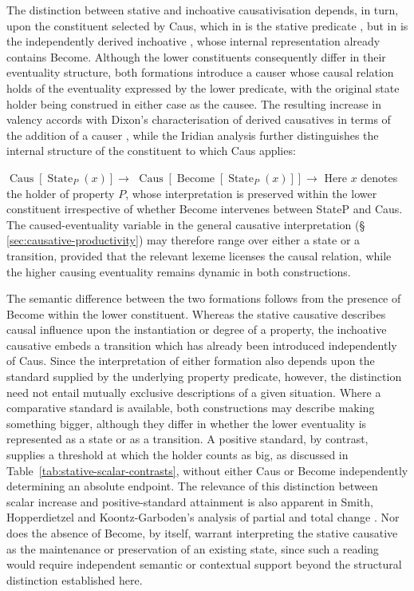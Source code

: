 The distinction between stative and inchoative causativisation depends, in
turn, upon the constituent selected by Caus, which in  is
the stative predicate  , but in
 is the independently derived inchoative ,
whose internal representation already contains Become. Although the lower
constituents consequently differ in their eventuality structure, both
formations introduce a causer whose causal relation holds of the
eventuality expressed by the lower predicate, with the original state
holder being construed in either case as the causee. The resulting
increase in valency accords with Dixon's characterisation of derived
causatives in terms of the addition of a causer \cite{dixon2000}, while the
Iridian analysis further distinguishes the internal structure of the
constituent to which Caus applies:

\pex\label{ex:stative-caus-structures}
\a $\operatorname{Caus}[\operatorname{State}_{P}(x)] \rightarrow$ 
\a $\operatorname{Caus}[\operatorname{Become}[\operatorname{State}_{P}(x)]] \rightarrow$ 
\xe
\noindent Here $x$ denotes the holder of property $P$, whose interpretation is
preserved within the lower constituent irrespective of whether Become
intervenes between StateP and Caus. The caused-eventuality variable in the
general causative interpretation (§\,\ref{sec:causative-productivity})
may therefore range over either a state or a transition, provided that the
relevant lexeme licenses the causal relation, while the higher causing
eventuality remains dynamic in both constructions.

The semantic difference between the two formations follows from the
presence of Become within the lower constituent. Whereas the stative
causative describes causal influence upon the instantiation or degree of a
property, the inchoative causative embeds a transition which has already
been introduced independently of Caus. Since the interpretation of either
formation also depends upon the standard supplied by the underlying
property predicate, however, the distinction need not entail mutually
exclusive descriptions of a given situation. Where a comparative standard
is available, both constructions may describe making something bigger,
although they differ in whether the lower eventuality is represented as a
state or as a transition. A positive standard, by contrast, supplies a
threshold at which the holder counts as big, as discussed in
Table~\ref{tab:stative-scalar-contrasts}, without either Caus or Become
independently determining an absolute endpoint. The relevance of this
distinction between scalar increase and positive-standard attainment is
also apparent in Smith, Hopperdietzel and Koontz-Garboden's analysis of
partial and total change
\cite[§5.1]{smithhopperdietzelkoontzgarboden2025}. Nor does the absence of
Become, by itself, warrant interpreting the stative causative as the
maintenance or preservation of an existing state, since such a reading
would require independent semantic or contextual support beyond the
structural distinction established here.

